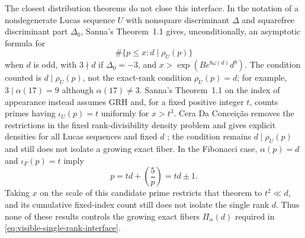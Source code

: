 \begin{remark}
The closest distribution theorems do not close this interface.  In the
notation of a nondegenerate Lucas sequence $U$ with nonsquare discriminant
$\Delta$ and squarefree discriminant part $\Delta_0$, Sanna's Theorem~1.1
\cite{Sanna2022RankDivisibility} gives, unconditionally, an asymptotic formula
for
\[
 \#\{p\le x:d\mid\rho_U(p)\}
\]
when $d$ is odd, with $3\nmid d$ if $\Delta_0=-3$, and
$x>\exp(Be^{8\omega(d)}d^8)$.  The condition counted is
$d\mid\rho_U(p)$, not the exact-rank condition $\rho_U(p)=d$; for example,
$3\mid\alpha(17)=9$ although $\alpha(17)\ne3$.  Sanna's Theorem~1.1 on the
index of appearance \cite{Sanna2024IndexAppearance} instead assumes GRH and,
for a fixed positive integer $t$, counts primes having
$\iota_U(p)=t$ uniformly for $x>t^3$. Cera Da Concei\c c\~ao removes the
restrictions in the fixed rank-divisibility density problem and gives
explicit densities for all Lucas sequences and fixed $d$
\cite{CeraDaConceicao2026PrimeDensities}; the condition remains
$d\mid\rho_U(p)$ and still does not isolate a growing exact fiber. In the
Fibonacci case,
$\alpha(p)=d$ and $\iota_F(p)=t$ imply
\[
 p=td+\left(\frac5p\right)=td\pm1.
\]
Taking $x$ on the scale of this candidate prime restricts that theorem to
$t^2\ll d$, and its cumulative fixed-index count still does not isolate the
single rank $d$. Thus none of these results controls the growing exact fibers
$\Pi_\alpha(d)$ required in \eqref{eq:visible-single-rank-interface}.


\end{remark}
